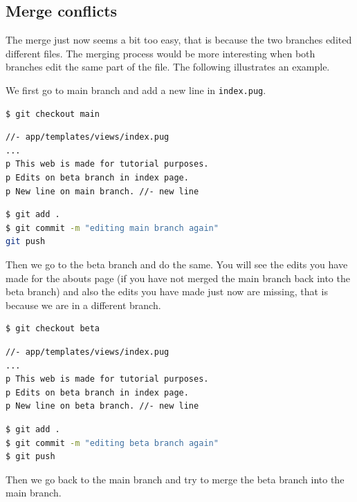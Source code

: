 \subsection{Merge conflicts}
\label{sec:mergeconflict}
The merge just now seems a bit too easy, that is because the two branches edited different files. The merging process would be more interesting when both branches edit the same part of the file. The following illustrates an example.
\vspace{6mm}

We first go to main branch and add a new line in \texttt{index.pug}.

\begin{lstlisting}[language=bash]
$ git checkout main
\end{lstlisting}

\begin{lstlisting}[language=pug]
//- app/templates/views/index.pug
...
p This web is made for tutorial purposes.
p Edits on beta branch in index page.
p New line on main branch. //- new line
\end{lstlisting}

\begin{lstlisting}[language=bash]
$ git add .
$ git commit -m "editing main branch again"
git push
\end{lstlisting}

Then we go to the beta branch and do the same. You will see the edits you have made for the abouts page (if you have not merged the main branch back into the beta branch) and also the edits you have made just now are missing, that is because we are in a different branch.

\begin{lstlisting}[language=bash]
$ git checkout beta
\end{lstlisting}

\begin{lstlisting}[language=pug]
//- app/templates/views/index.pug
...
p This web is made for tutorial purposes.
p Edits on beta branch in index page.
p New line on beta branch. //- new line
\end{lstlisting}

\begin{lstlisting}[language=bash]
$ git add .
$ git commit -m "editing beta branch again"
$ git push
\end{lstlisting}

Then we go back to the main branch and try to merge the beta branch into the main branch.

